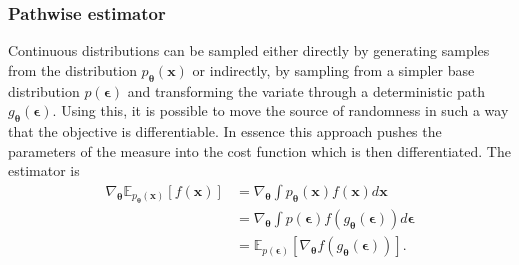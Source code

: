 \subsubsection{Pathwise estimator}
Continuous distributions can be sampled either directly by generating samples from the distribution $p_{\boldsymbol{\theta}}(\mathbf{x})$ or indirectly, by sampling from a simpler base distribution $p(\boldsymbol{\epsilon})$ and transforming the variate through a deterministic path $g_{\boldsymbol{\theta}}(\boldsymbol{\epsilon})$. Using this, it is possible to move the source of randomness in such a way that the objective is differentiable. In essence this approach pushes the parameters of the measure into the cost function which is then differentiated. The estimator is
\begin{equation}
\begin{aligned}
\nabla_{\boldsymbol{\theta}} \mathbb{E}_{p_{\boldsymbol{\theta}}(\mathbf{x})}[f(\mathbf{x})] 
&=\nabla_{\boldsymbol{\theta}} \int p_{\boldsymbol{\theta}}(\mathbf{x}) f(\mathbf{x}) d \mathbf{x} \\
&= \nabla_{\boldsymbol{\theta}} \int p(\boldsymbol{\epsilon}) f(g_{\boldsymbol{\theta}}(\boldsymbol{\epsilon})) d \boldsymbol{\epsilon} \\
&= \mathbb{E}_{p(\boldsymbol{\epsilon})}\left[\nabla_{\boldsymbol{\theta}} f(g_{\boldsymbol{\theta}}(\boldsymbol{\epsilon}))\right].
\end{aligned}
\end{equation}
